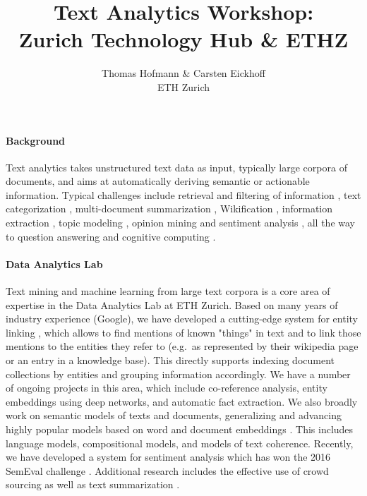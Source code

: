 \documentclass{article}
\title{Text Analytics Workshop: \\ Zurich Technology Hub \& ETHZ}
\author{Thomas Hofmann \& Carsten Eickhoff \\ ETH Zurich}
\begin{document}
\maketitle

\paragraph{Background} Text analytics takes unstructured text data as input, typically large corpora of documents, and aims at automatically deriving semantic or actionable information. Typical challenges include retrieval and filtering of information \cite{manning2008introduction}, text categorization \cite{sebastiani2002machine}, multi-document summarization \cite{mcdonald2007study}, Wikification \cite{mihalcea2007wikify}, information extraction \cite{banko2007open}, topic modeling \cite{hofmann1999probabilistic, blei2012probabilistic}, opinion mining and sentiment analysis \cite{pang2008opinion}, all the way to question answering and cognitive computing \cite{modha2011cognitive}. 

\paragraph{Data Analytics Lab} Text mining and machine learning from large text corpora is a core area of expertise in the Data Analytics Lab at ETH Zurich. Based on many years of industry experience (Google), we have developed a cutting-edge system for entity linking \cite{ganea2015probabilistic}, which allows to find mentions of known "things"  in text and to link those mentions to the entities they refer to (e.g.~as represented by their wikipedia page or an entry in a knowledge base). This directly supports indexing document collections by entities and grouping information accordingly. We have a number of ongoing projects in this area, which include co-reference analysis, entity embeddings using deep networks, and automatic fact extraction. We also broadly work on semantic models of texts and documents, generalizing and advancing highly popular models based on word \cite{mikolov2013distributed} and document embeddings \cite{le2014distributed}. This includes language models, compositional models, and models of text coherence. Recently, we have developed a system for sentiment analysis \cite{Deriu2016} which has won the 2016 SemEval challenge \cite{SemEval:2016:task4}. Additional research includes the effective use of crowd sourcing \cite{davtyan2015exploiting} as well as text summarization \cite{li2014interactive}.
\end{document}
